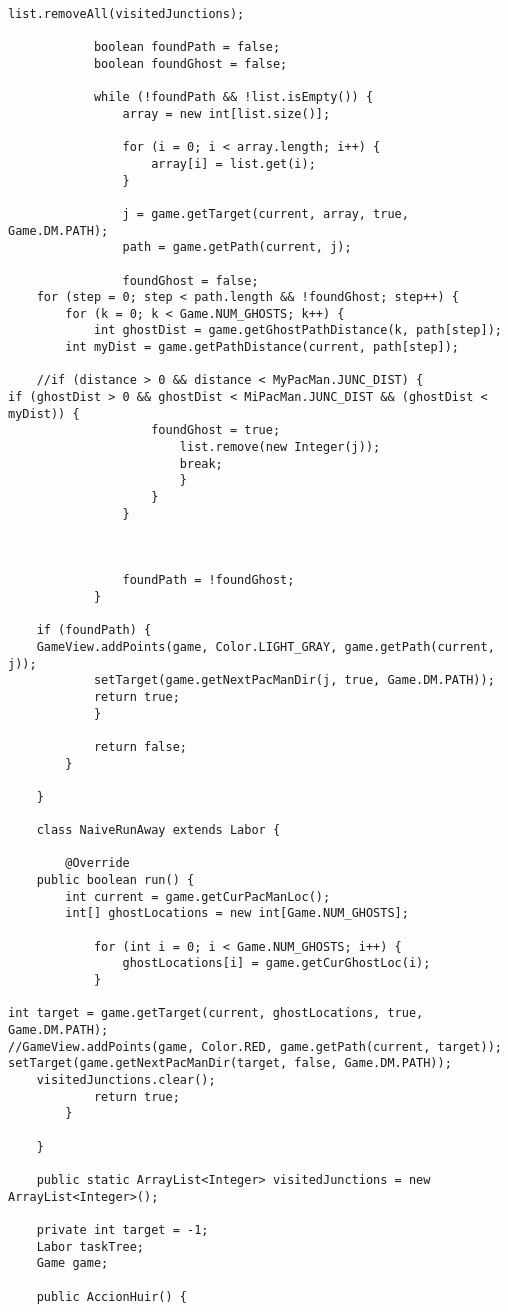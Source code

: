 \documentclass[11pt]{article}
\begin{document}
\begin{lstlisting}[frame=single]
			list.removeAll(visitedJunctions);
			
			boolean foundPath = false;
			boolean foundGhost = false;
			
			while (!foundPath && !list.isEmpty()) {
				array = new int[list.size()];
				
				for (i = 0; i < array.length; i++) {
					array[i] = list.get(i);
				}
				
				j = game.getTarget(current, array, true, Game.DM.PATH);
				path = game.getPath(current, j);
				
				foundGhost = false;
	for (step = 0; step < path.length && !foundGhost; step++) {
		for (k = 0; k < Game.NUM_GHOSTS; k++) {
			int ghostDist = game.getGhostPathDistance(k, path[step]);
		int myDist = game.getPathDistance(current, path[step]);
						
	//if (distance > 0 && distance < MyPacMan.JUNC_DIST) {
if (ghostDist > 0 && ghostDist < MiPacMan.JUNC_DIST && (ghostDist < myDist)) {
					foundGhost = true;
						list.remove(new Integer(j));
						break;
						}
					}
				}
				
				
				
				foundPath = !foundGhost;
			}
			
	if (foundPath) {
	GameView.addPoints(game, Color.LIGHT_GRAY, game.getPath(current, j));
			setTarget(game.getNextPacManDir(j, true, Game.DM.PATH));
			return true;
			}
			
			return false;
		}
		
	}
	
	class NaiveRunAway extends Labor {

		@Override
	public boolean run() {
		int current = game.getCurPacManLoc();
		int[] ghostLocations = new int[Game.NUM_GHOSTS];
			
			for (int i = 0; i < Game.NUM_GHOSTS; i++) {
				ghostLocations[i] = game.getCurGhostLoc(i);
			}
			
int target = game.getTarget(current, ghostLocations, true, Game.DM.PATH);
//GameView.addPoints(game, Color.RED, game.getPath(current, target));
setTarget(game.getNextPacManDir(target, false, Game.DM.PATH));
	visitedJunctions.clear();
			return true;
		}
		
	}
	
	public static ArrayList<Integer> visitedJunctions = new ArrayList<Integer>();
	
	private int target = -1;
	Labor taskTree;
	Game game;
	
	public AccionHuir() {
		

\end{lstlisting}
\end{document}
